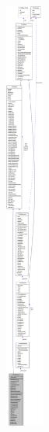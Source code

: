 \begin{figure}[H]
\begin{center}
\leavevmode
\includegraphics[height=400pt]{class_ti_xml_element__coll__graph}
\end{center}
\end{figure}
